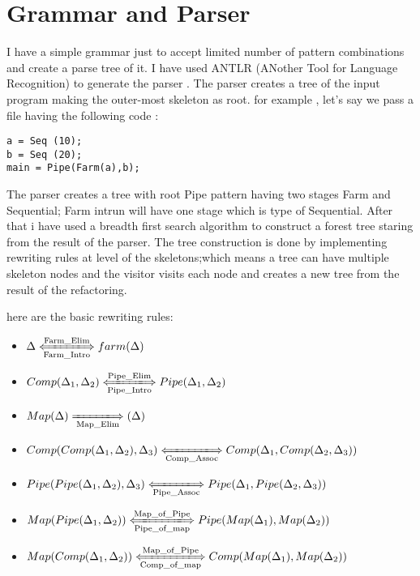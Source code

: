 \documentclass[12pt]{report}
\begin{document}
	
\title{}

\maketitle

\section{Grammar and Parser}
I have a simple grammar just to accept limited number of pattern combinations and create a parse tree of it. I have used ANTLR (ANother Tool for Language Recognition)  to generate the parser . The parser creates a tree of the input program making the outer-most skeleton as root. for example , let's say we pass a file having the following code :

\begin{lstlisting}[style=refactor]
a = Seq (10);
b = Seq (20);
main = Pipe(Farm(a),b);
\end{lstlisting}
The parser creates a tree with root Pipe pattern having two stages Farm and Sequential; Farm intrun will have one stage which is type of Sequential. After that i have used a breadth first search algorithm to construct a forest tree staring from the result of the parser. The tree construction is done by implementing rewriting rules at level of the skeletons;which means a tree can have multiple skeleton nodes and the visitor visits each node and creates a new tree from the result of the refactoring. 

here are the basic rewriting rules:

\begin{itemize}
\item $\Delta \xLongleftrightarrow[\text{Farm\_Intro}]{\text{Farm\_Elim}} farm (\Delta)$\\
\item $Comp(\Delta_1, \Delta_2 )\xLongleftrightarrow[\text{Pipe\_Intro}]{\text{Pipe\_Elim}} Pipe (\Delta_1,\Delta_2)$\\
\item $Map(\Delta) \xLongrightarrow[\text{Map\_Elim}]{\text{}}  (\Delta)$\\
\item $Comp(Comp(\Delta_1, \Delta_2 ),\Delta_3)\xLongleftrightarrow[\text{Comp\_Assoc}]{\text{}} Comp (\Delta_1,Comp(\Delta_2,\Delta_3))$\\
\item $Pipe(Pipe(\Delta_1, \Delta_2 ),\Delta_3)\xLongleftrightarrow[\text{Pipe\_Assoc}]{\text{}} Pipe (\Delta_1,Pipe(\Delta_2,\Delta_3))$\\
\item $Map(Pipe(\Delta_1, \Delta_2 ))\xLongleftrightarrow[\text{Pipe\_of\_map}]{\text{Map\_of\_Pipe}} Pipe (Map(\Delta_1),Map(\Delta_2))$\\
\item $Map(Comp(\Delta_1, \Delta_2 ))\xLongleftrightarrow[\text{Comp\_of\_map}]{\text{Map\_of\_Pipe}} Comp (Map(\Delta_1),Map(\Delta_2))$\\
\end{itemize}
\end{document}
